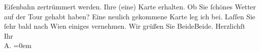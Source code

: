 \begin{ledgroupsized}[t]{13cm}
               Eiſenbahn zer{\pb}trümmert werden. Ihre (eine) Karte
               erhalten. Ob Sie ſchönes Wetter auf der Tour gehabt haben? Eine neulich gekommene
               Karte leg ich bei.\pend
           \pstart
           Laſſen Sie ſehr bald nach Wien einiges vernehmen.\pend
           \pstart
           Wir grüßen Sie BeideBeide.\pend
           \pstart
           Herzlichſt Ihr{\\[\baselineskip]}\spacefill\mbox{A.}\pend
           \leftskip=0em{}\endnumbering{}\end{ledgroupsized}  \newcommand{\dateiname}{L01446}\newcommand{\titel}{Arthur Schnitzler an Hugo von Hofmannsthal, 16. 9. 1904}\newcommand{\editorInnen}{Martin Anton Müller und Gerd-Hermann Susen}
      